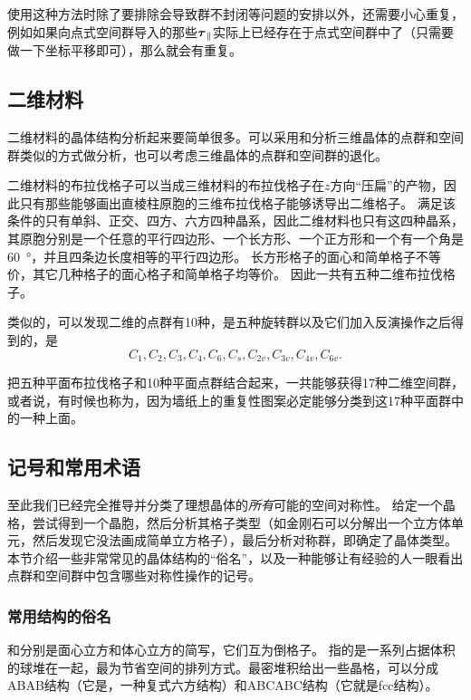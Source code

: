 使用这种方法时除了要排除会导致群不封闭等问题的安排以外，还需要小心重复，例如如果向点式空间群导入的那些$\vb*{\tau}_\parallel$实际上已经存在于点式空间群中了（只需要做一下坐标平移即可），那么就会有重复。

\subsection{二维材料}

二维材料的晶体结构分析起来要简单很多。可以采用和分析三维晶体的点群和空间群类似的方式做分析，也可以考虑三维晶体的点群和空间群的退化。

二维材料的布拉伐格子可以当成三维材料的布拉伐格子在$z$方向“压扁”的产物，因此只有那些能够画出直棱柱原胞的三维布拉伐格子能够诱导出二维格子。
满足该条件的只有单斜、正交、四方、六方四种晶系，因此二维材料也只有这四种晶系，其原胞分别是一个任意的平行四边形、一个长方形、一个正方形和一个有一个角是\SI{60}{\degree}，并且四条边长度相等的平行四边形。
长方形格子的面心和简单格子不等价，其它几种格子的面心格子和简单格子均等价。
因此一共有五种二维布拉伐格子。

类似的，可以发现二维的点群有10种，是五种旋转群以及它们加入反演操作之后得到的，是
\[
    C_1, C_2, C_3, C_4, C_6, C_s, C_{2v}, C_{3v}, C_{4v}, C_{6v}.
\]

把五种平面布拉伐格子和10种平面点群结合起来，一共能够获得17种二维空间群，或者说，有时候也称为，因为墙纸上的重复性图案必定能够分类到这17种平面群中的一种上面。

\subsection{记号和常用术语}

至此我们已经完全推导并分类了理想晶体的\emph{所有}可能的空间对称性。
给定一个晶格，尝试得到一个晶胞，然后分析其格子类型（如金刚石可以分解出一个立方体单元，然后发现它没法画成简单立方格子），最后分析对称群，即确定了晶体类型。
本节介绍一些非常常见的晶体结构的“俗名”，以及一种能够让有经验的人一眼看出点群和空间群中包含哪些对称性操作的记号。

\subsubsection{常用结构的俗名} 

和分别是面心立方和体心立方的简写，它们互为倒格子。
指的是一系列占据体积的球堆在一起，最为节省空间的排列方式。最密堆积给出一些晶格，可以分成ABAB结构（它是，一种复式六方结构）和ABCABC结构（它就是fcc结构）。

